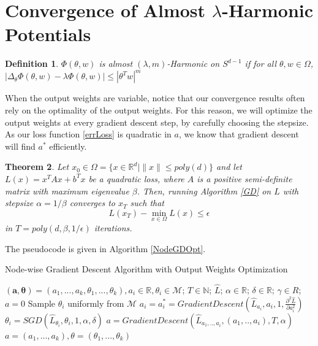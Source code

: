 \documentclass{article}
\newtheorem{theorem}{Theorem}[section]
\newtheorem{definition}[theorem]{Definition}
\newcommand{\N}{{\mathbb{N}}}
\newcommand{\R}{{\mathbb{R}}}
\newcommand{\Authornote}[2]{{\sf\color{red}{[#1: #2]}}}
\newcommand{\Authornote}[2]{}
\newcommand{\Rnote}{\Authornote{R}}
\begin{document}
\section{Convergence of Almost $\lambda$-Harmonic Potentials}\label{App:EigenFunc}

\begin{definition}
$\Phi(\theta, w)$ is almost $(\lambda,m)$-Harmonic on $S^{d-1}$ if for all $\theta, w\in \Omega$, $|\Delta_{\theta}\Phi(\theta, w) - \lambda \Phi (\theta,w)| \leq |\theta^Tw|^m$ 
\end{definition}
\Rnote{Not sure if there is a nice general definition to be honest...to be discussed}

When the output weights are variable, notice that our convergence results often rely on the optimality of the output weights. For this reason, we will optimize the output weights at every gradient descent step, by carefully choosing the stepsize. As our loss function \eqref{errLoss} is quadratic in $a$, we know that gradient descent will find $a^*$ efficiently. 
%
\begin{theorem}\cite{nesterov2013introductory}\label{quadConverge}
  Let $x_0 \in \Omega = \{ x \in \R^d | \|x \| \leq poly(d)\}$ and let
  $L(x) = x^TAx + b^Tx$ be a quadratic loss, where $A$ is a positive
  semi-definite matrix with maximum eigenvalue $\beta$. Then, running
  Algorithm \ref{GD} on $L$ with stepsize $\alpha = 1/\beta$ converges
  to $x_T$ such that
  \[L(x_T) - \min_{x \in \Omega} L(x) \leq \epsilon\]
  in $T = poly(d, \beta, 1/\epsilon)$ iterations.
\end{theorem} 

\noindent The pseudocode is given in Algorithm \ref{NodeGDOpt}. 
%
\begin{algorithm}[tb]
 \caption{Node-wise Gradient Descent Algorithm with Output Weights Optimization}
   \label{NodeGDOpt}
\begin{algorithmic}
  $(\boldsymbol{a,\theta}) = (a_1,...,a_k,\theta_1,...,\theta_k), a_i
  \in\R, \theta_i\in\mathcal{M}$;
  $T\in \N$; $\widehat{L}$; $\alpha\in \R$; $\delta \in \R$;
  $\gamma \in R$; \vspace{0.1in}  $a = 0$
   \REPEAT \STATE Sample $\theta_i$
  uniformly from $\mathcal{M}$
   \STATE
  $a_i = a_i^* = GradientDescent \left(\widehat{L}_{a_i}, a_i, 1,
    \frac{\partial^2 \hat{L}}{\partial a_i^2} \right)$
  \STATE
  $\theta_i = SGD \left(\widehat{L}_{\theta_i}, \theta_i,1, \alpha,\delta \right)$
   \ENDFOR
   \STATE    $a =  GradientDescent \left(\widehat{L}_{a_1,..,a_i},
     (a_1,..,a_i), T , \alpha \right)$\;
   \ENDFOR
    $a = (a_1,...,a_k), \theta = (\theta_1,..., \theta_k)$
   \end{algorithmic}
\end{algorithm}
\end{document}
